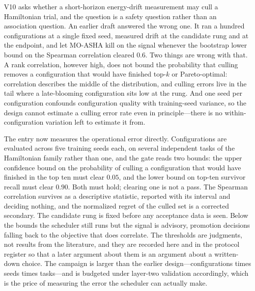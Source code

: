 V10 asks whether a short-horizon energy-drift measurement may cull a
Hamiltonian trial, and the question is a safety question rather than an
association question. An earlier draft answered the wrong one. It ran a
hundred configurations at a single fixed seed, measured drift at the
candidate rung and at the endpoint, and let MO-ASHA kill on the signal
whenever the bootstrap lower bound on the Spearman correlation cleared
$0.6$. Two things are wrong with that. A rank correlation, however high,
does not bound the probability that culling removes a configuration that
would have finished top-$k$ or Pareto-optimal: correlation describes the
middle of the distribution, and culling errors live in the tail where a
late-blooming configuration sits low at the rung. And one seed per
configuration confounds configuration quality with training-seed
variance, so the design cannot estimate a culling error rate even in
principle—there is no within-configuration variation left to estimate it
from.

The entry now measures the operational error directly. Configurations
are evaluated across five training seeds each, on several independent
tasks of the Hamiltonian family rather than one, and the gate reads two
bounds: the upper confidence bound on the probability of culling a
configuration that would have finished in the top ten must clear
$0.05$, and the lower bound on top-ten survivor recall must clear
$0.90$. Both must hold; clearing one is not a pass. The Spearman
correlation survives as a descriptive statistic, reported with its
interval and deciding nothing, and the normalized regret of the culled
set is a corrected secondary. The candidate rung is fixed before any
acceptance data is seen. Below the bounds the scheduler still runs but
the signal is advisory, promotion decisions falling back to the
objective that does correlate. The thresholds are judgments, not results
from the literature, and they are recorded here and in the protocol
register so that a later argument about them is an argument about a
written-down choice. The campaign is larger than the earlier
design—configurations times seeds times tasks—and is budgeted under
layer-two validation accordingly, which is the price of measuring the
error the scheduler can actually make.

